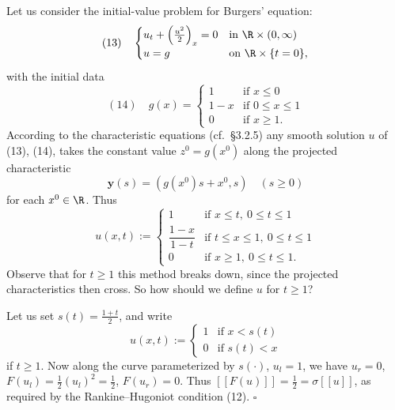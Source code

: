 \begin{example}
\label{ex:burgers-shock-formation}
Let us consider the initial-value problem for Burgers' equation:
$$(13) \quad \begin{cases} u_t + \left(\frac{u^2}{2}\right)_x = 0 & \text{in } \R \times (0,\infty) \\ u = g & \text{on } \R \times \{t=0\}, \end{cases}$$
with the initial data
$$(14) \quad g(x) = \begin{cases} 1 & \text{if } x \leq 0 \\ 1-x & \text{if } 0 \leq x \leq 1 \\ 0 & \text{if } x \geq 1. \end{cases}$$
According to the characteristic equations (cf.\ \S 3.2.5) any smooth solution $u$ of (13), (14), takes the constant value $z^0 = g(x^0)$ along the projected characteristic
$$\mathbf{y}(s) = (g(x^0)s + x^0, s) \quad (s \geq 0)$$
for each $x^0 \in \R$. Thus
$$u(x,t) := \begin{cases} 1 & \text{if } x \leq t,\ 0 \leq t \leq 1 \\ \dfrac{1-x}{1-t} & \text{if } t \leq x \leq 1,\ 0 \leq t \leq 1 \\ 0 & \text{if } x \geq 1,\ 0 \leq t \leq 1. \end{cases}$$
Observe that for $t \geq 1$ this method breaks down, since the projected characteristics then cross. So how should we define $u$ for $t \geq 1$?

Let us set $s(t) = \frac{1+t}{2}$, and write
$$u(x,t) := \begin{cases} 1 & \text{if } x < s(t) \\ 0 & \text{if } s(t) < x \end{cases}$$
if $t \geq 1$. Now along the curve parameterized by $s(\cdot)$, $u_l = 1$, we have $u_r = 0$, $F(u_l) = \frac{1}{2}(u_l)^2 = \frac{1}{2}$, $F(u_r) = 0$. Thus $[[F(u)]] = \frac{1}{2} = \sigma[[u]]$, as required by the Rankine--Hugoniot condition (12). $\square$
\end{example}

\begin{figure}[h]\centering
\end{figure}

